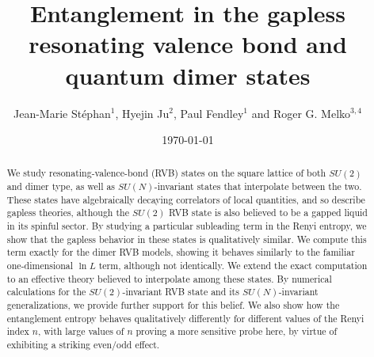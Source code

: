 \documentclass[11pt]{iopart}
\begin{document}
 
\title[Entanglement in RVB and quantum dimer states]{Entanglement in the gapless resonating valence bond and quantum dimer states}
 
\author{Jean-Marie St\'ephan$^1$, Hyejin Ju$^2$, Paul Fendley$^1$ and Roger G. Melko$^{3,4}$}

\address{$^1$ Physics Department, University of Virginia, Charlottesville, VA 22904-4714}

\address{$^2$ Department of Physics, University of California, Santa Barbara, CA, 93106-9530}

\address{$^3$ Department of Physics and Astronomy, University of Waterloo, Ontario, N2L 3G1, Canada}

\address{$^4$ Perimeter Institute for Theoretical Physics, Waterloo, Ontario N2L 2Y5, Canada}



\date{\today}
\begin{abstract}

We study resonating-valence-bond (RVB) states on the square lattice of both $SU(2)$ and dimer type,  as well as $SU(N)$-invariant states that interpolate between the two. These states have algebraically decaying correlators of local quantities, and so describe gapless theories, although the $SU(2)$ RVB state is also believed to be a gapped liquid in its spinful sector. By studying a particular subleading term in the Renyi entropy, we show that the gapless behavior in these states is qualitatively similar. We compute this term exactly for the dimer RVB models, showing it behaves similarly to the familiar one-dimensional $\ln L$ term, although not identically. We extend the exact computation to an effective theory believed to interpolate among these states. By numerical calculations for the $SU(2)$-invariant RVB state and its $SU(N)$-invariant generalizations, we provide further support for this belief. We also show how the entanglement entropy behaves qualitatively differently for different values of the 
Renyi index $n$, with large values of $n$ proving a more sensitive probe here, by virtue of exhibiting a striking even/odd effect.


\end{abstract}
\maketitle
\end{document}
